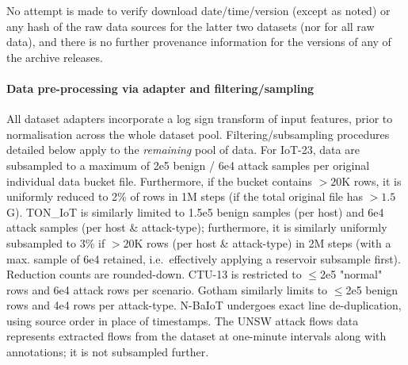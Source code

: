 No attempt is made to verify download date/time/version (except as noted) or any hash of the raw data sources for the latter two datasets (nor for all raw data), and there is no further provenance information for the versions of any of the archive releases.

\paragraph{Data pre-processing via adapter and filtering/sampling} 
All dataset adapters incorporate a log sign transform of input features, prior to normalisation across the whole dataset pool. Filtering/subsampling procedures detailed below apply to the \emph{remaining} pool of data. For IoT-23, data are subsampled to a maximum of 2e5 benign / 6e4 attack samples per original individual data bucket file. Furthermore, if the bucket contains $>20$K rows, it is uniformly reduced to 2\% of rows in 1M steps (if the total original file has $>1.5$G). TON\_IoT is similarly limited to 1.5e5 benign samples (per host) and 6e4 attack samples (per host \& attack-type); furthermore, it is similarly uniformly subsampled to 3\% if $>20$K rows (per host \& attack-type) in 2M steps (with a max. sample of 6e4 retained, i.e.\ effectively applying a reservoir subsample first). Reduction counts are rounded-down. CTU-13 is restricted to $\leq$2e5 "normal" rows and 6e4 attack rows per scenario. Gotham similarly limits to $\leq$2e5 benign rows and 4e4 rows per attack-type. N-BaIoT undergoes exact line de-duplication, using source order in place of timestamps. The UNSW attack flows data represents extracted flows from the dataset at one-minute intervals along with annotations; it is not subsampled further.
